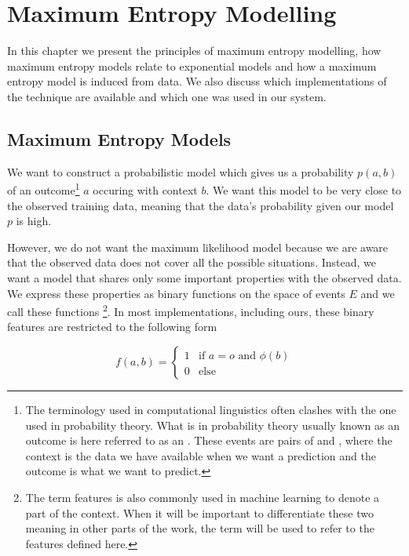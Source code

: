 \chapter{Maximum Entropy Modelling}
\label{chap:maxent}

In this chapter we present the principles of maximum entropy modelling, how
maximum entropy models relate to exponential models and how a maximum entropy
model is induced from data. We also discuss which implementations of the
technique are available and which one was used in our system.

\section{Maximum Entropy Models}
\label{chap:maxent-maxent} 

We want to construct a probabilistic model which gives us a probability
$p(a,b)$ of an outcome\footnote{The terminology used in computational
linguistics often clashes with the one used in probability theory. What is in
probability theory usually known as an outcome is here referred to as an
. These events are pairs of  and
, where the context is the data we have available when we
want a prediction and the outcome is what we want to predict.} $a$ occuring
with context $b$. We want this model to be very close to the observed training
data, meaning that the data's probability given our model $p$ is high.

However, we do not want the maximum likelihood model because we
are aware that the observed data does not cover all the possible situations.
Instead, we want a model that shares only some important properties with the
observed data. We express these properties as binary functions on the space of
events $E$ and we call these functions \footnote{The term
features is also commonly used in machine learning to denote a part of the
context. When it will be important to differentiate these two meaning in other
parts of the work, the term  will be used to
refer to the features defined here.}. In most implementations, including ours,
these binary features are restricted to the following form

\begin{equation}
\label{eq:common-feature}
f(a,b) =
\begin{cases}
  1 & \text{if } a=o \text{ and } \phi(b) \\
  0 & \text{else}
\end{cases}
\end{equation}

